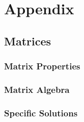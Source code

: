 \section{Appendix}
\subsection{Matrices}
\subsubsection{Matrix Properties}\label{app:mat_prop}



\subsubsection{Matrix Algebra}



\subsubsection{Specific Solutions}


